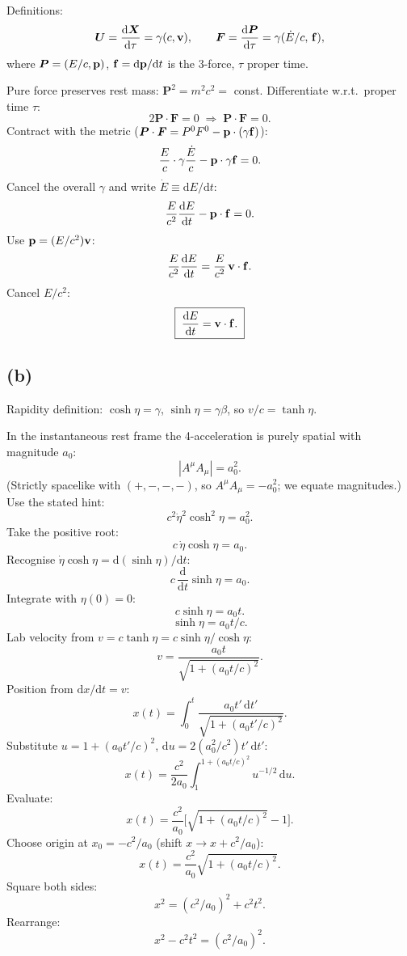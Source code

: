 \documentclass[11pt]{article}
\newcommand{\de}{\mathrm{d}}
\begin{document}
Definitions:
\[ \bm U = \frac{\de \bm X}{\de\tau} = \gamma(c,\vb v),\qquad \bm F = \frac{\de \bm P}{\de\tau} = \gamma(\dot E/c,\,\vb f), \]
where $\bm P=(E/c,\vb p)$, $\vb f=\de\vb p/\de t$ is the 3-force, $\tau$ proper time.

Pure force preserves rest mass: $\bm P^2 = m^2c^2 = $ const. Differentiate w.r.t.\ proper time $\tau$:
\[ 2\bm P\cdot\bm F = 0 \;\Rightarrow\; \bm P\cdot\bm F = 0. \]
Contract with the metric ($\bm P\cdot\bm F = P^0 F^0 - \vb p\cdot(\gamma\vb f)$):
\[ \frac{E}{c}\cdot\gamma\frac{\dot E}{c} - \vb p\cdot\gamma\vb f = 0. \]
Cancel the overall $\gamma$ and write $\dot E\equiv\de E/\de t$:
\[ \frac{E}{c^2}\frac{\de E}{\de t} - \vb p\cdot\vb f = 0. \]
Use $\vb p = (E/c^2)\vb v$:
\[ \frac{E}{c^2}\frac{\de E}{\de t} = \frac{E}{c^2}\,\vb v\cdot\vb f. \]
Cancel $E/c^2$:
\[ \boxed{\;\frac{\de E}{\de t} = \vb v\cdot\vb f.\;} \]

\subsection*{(b)}

Rapidity definition: $\cosh\eta=\gamma$, $\sinh\eta=\gamma\beta$, so $v/c=\tanh\eta$.

In the instantaneous rest frame the 4-acceleration is purely spatial with magnitude $a_0$:
\[ |A^\mu A_\mu| = a_0^2. \]
(Strictly spacelike with $(+,-,-,-)$, so $A^\mu A_\mu = -a_0^2$; we equate magnitudes.) Use the stated hint:
\[ c^2\dot\eta^2\cosh^2\eta = a_0^2. \]
Take the positive root:
\[ c\,\dot\eta\cosh\eta = a_0. \]
Recognise $\dot\eta\cosh\eta = \de(\sinh\eta)/\de t$:
\[ c\,\frac{\de}{\de t}\sinh\eta = a_0. \]
Integrate with $\eta(0)=0$:
\[ c\sinh\eta = a_0 t. \]
\begin{equation}
\sinh\eta = a_0 t/c.
\label{eq:eta-t}
\end{equation}
Lab velocity from $v = c\tanh\eta = c\sinh\eta/\cosh\eta$:
\[ v = \frac{a_0 t}{\sqrt{1+(a_0 t/c)^2}}. \]
Position from $\de x/\de t = v$:
\[ x(t) = \int_0^t \frac{a_0 t'\,\de t'}{\sqrt{1+(a_0 t'/c)^2}}. \]
Substitute $u = 1+(a_0 t'/c)^2$, $\de u = 2(a_0^2/c^2) t'\,\de t'$:
\[ x(t) = \frac{c^2}{2a_0}\int_1^{1+(a_0t/c)^2} u^{-1/2}\,\de u. \]
Evaluate:
\[ x(t) = \frac{c^2}{a_0}\bigl[\sqrt{1+(a_0 t/c)^2}-1\bigr]. \]
Choose origin at $x_0 = -c^2/a_0$ (shift $x\to x+c^2/a_0$):
\[ x(t) = \frac{c^2}{a_0}\sqrt{1+(a_0 t/c)^2}. \]
Square both sides:
\[ x^2 = (c^2/a_0)^2 + c^2 t^2. \]
Rearrange:
\begin{equation}
\boxed{\;x^2 - c^2 t^2 = (c^2/a_0)^2.\;}
\label{eq:hyperbola}
\end{equation}
\end{document}
